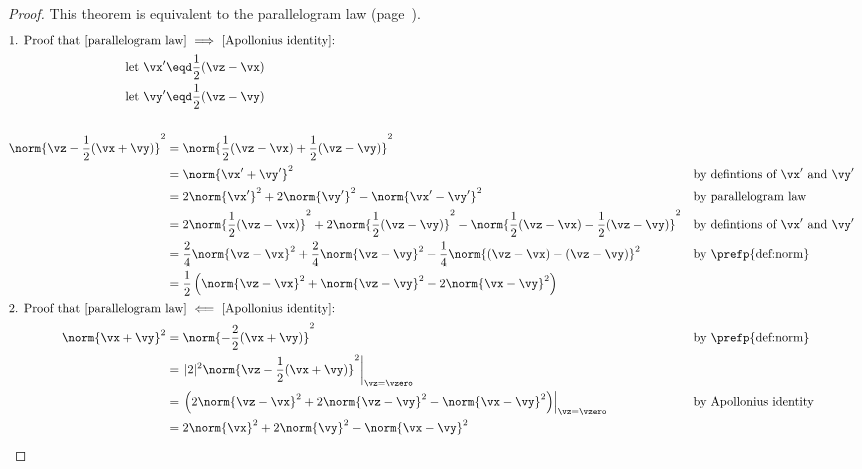 \begin{proof}
This theorem is equivalent to the parallelogram law (page~\pageref{thm:parallelogram}).
\begin{align*}
  \intertext{1. Proof that [parallelogram law] $\implies$ [Apollonius identity]:}
    \text{let } \vx' &\eqd \frac{1}{2}(\vz - \vx)  \\
    \text{let } \vy' &\eqd \frac{1}{2}(\vz - \vy)  \\
    \\
    \norm{\vz - \frac{1}{2}(\vx+\vy)}^2
      &= \norm{\frac{1}{2}(\vz - \vx) + \frac{1}{2}(\vz - \vy)}^2
    \\&= \norm{\vx' + \vy'}^2
      && \text{by defintions of $\vx'$ and $\vy'$}
    \\&= 2\norm{\vx'}^2 + 2\norm{\vy'}^2 - \norm{\vx'-\vy'}^2
      && \text{by parallelogram law}
    \\&= 2\norm{\frac{1}{2}(\vz - \vx)}^2 + 2\norm{\frac{1}{2}(\vz - \vy)}^2 - \norm{\frac{1}{2}(\vz - \vx)-\frac{1}{2}(\vz - \vy)}^2
      && \text{by defintions of $\vx'$ and $\vy'$}
    \\&= \frac{2}{4}\norm{\vz - \vx}^2 + \frac{2}{4}\norm{\vz - \vy}^2 - \frac{1}{4}\norm{(\vz - \vx)-(\vz - \vy)}^2
      && \text{by \prefp{def:norm}}
    \\&= \frac{1}{2} \left( \norm{\vz-\vx}^2 + \norm{\vz-\vy}^2 - 2 \norm{\vx-\vy}^2 \right)
    \\
  \intertext{2. Proof that [parallelogram law] $\impliedby$ [Apollonius identity]:}
    \norm{\vx+\vy}^2
      &= \norm{-\frac{2}{2}(\vx+\vy)}^2
      && \text{by \prefp{def:norm}}
    \\&= \left. |2|^2\norm{\vz-\frac{1}{2}(\vx+\vy)}^2 \right|_{\vz=\vzero}
    \\&= \left. \left( 2\norm{\vz-\vx}^2 + 2\norm{\vz-\vy}^2 - \norm{\vx-\vy}^2 \right)\right|_{\vz=\vzero}
      && \text{by Apollonius identity}
    \\&= 2\norm{\vx}^2 + 2\norm{\vy}^2 - \norm{\vx-\vy}^2
\end{align*}


\end{proof}
